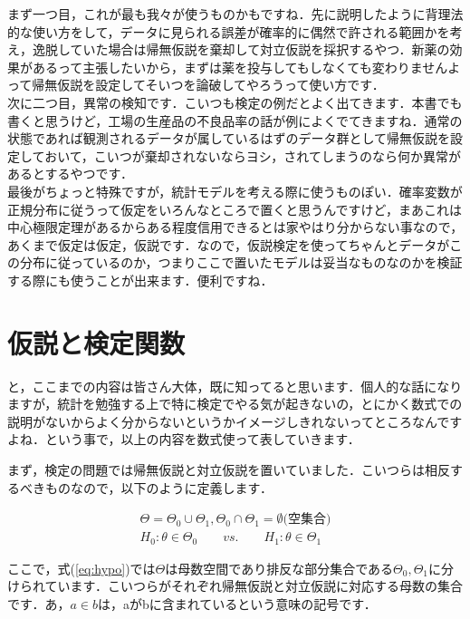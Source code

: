 \documentclass[11pt,a4paper,uplatex]{ujreport} 	%
\begin{document}
まず一つ目，これが最も我々が使うものかもですね．先に説明したように背理法的な使い方をして，データに見られる誤差が確率的に偶然で許される範囲かを考え，逸脱していた場合は帰無仮説を棄却して対立仮説を採択するやつ．新薬の効果があるって主張したいから，まずは薬を投与してもしなくても変わりませんよって帰無仮説を設定してそいつを論破してやろうって使い方です．\\

次に二つ目，異常の検知です．こいつも検定の例だとよく出てきます．本書でも書くと思うけど，工場の生産品の不良品率の話が例によくでてきますね．通常の状態であれば観測されるデータが属しているはずのデータ群として帰無仮説を設定しておいて，こいつが棄却されないならヨシ，されてしまうのなら何か異常があるとするやつです．\\

最後がちょっと特殊ですが，統計モデルを考える際に使うものぽい．確率変数が正規分布に従うって仮定をいろんなところで置くと思うんですけど，まあこれは中心極限定理があるからある程度信用できるとは家やはり分からない事なので，あくまで仮定は仮定，仮説です．なので，仮説検定を使ってちゃんとデータがこの分布に従っているのか，つまりここで置いたモデルは妥当なものなのかを検証する際にも使うことが出来ます．便利ですね．

\section{仮説と検定関数}
と，ここまでの内容は皆さん大体，既に知ってると思います．個人的な話になりますが，統計を勉強する上で特に検定でやる気が起きないの，とにかく数式での説明がないからよく分からないというかイメージしきれないってところなんですよね．という事で，以上の内容を数式使って表していきます．

まず，検定の問題では帰無仮説と対立仮説を置いていました．こいつらは相反するべきものなので，以下のように定義します．

\begin{align}
  \Theta = \Theta_0 \cup \Theta_1, \Theta_0 \cap \Theta_1 = \emptyset \text{(空集合)}
  \label{eq:hypo}\\
  H_0: \theta \in \Theta_0 \qquad vs. \qquad H_1:\theta \in \Theta_1
  \label{eq:vs}
\end{align}

ここで，式(\ref{eq:hypo})では$\Theta$は母数空間であり排反な部分集合である$\Theta_0, \Theta_1$に分けられています．こいつらがそれぞれ帰無仮説と対立仮説に対応する母数の集合です．あ，$a \in b$は，aがbに含まれているという意味の記号です．\\
\end{document}
